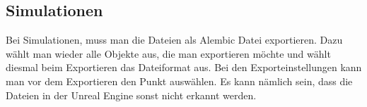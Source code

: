 \subsection{Simulationen}
\label{Simulation_Heading}
Bei Simulationen, muss man die Dateien als Alembic Datei exportieren. Dazu wählt man wieder alle Objekte aus, die man exportieren möchte und
wählt diesmal beim Exportieren das Dateiformat  aus. Bei den Exporteinstellungen kann man vor dem Exportieren den Punkt  auswählen.
Es kann nämlich sein, dass die Dateien in der Unreal Engine sonst nicht erkannt werden.